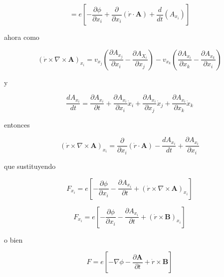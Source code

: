\documentclass[12pt,a4paper]{article}
\begin{document}
\begin{enumerate}
    \begin{equation*}
        = e\left[-\frac{\partial \phi}{\partial x_i}  +\frac{\partial}{\partial x_{i}}\left( \dot{r} \cdot \mathbf{A}\right) + \frac{d}{dt} \left( A_{x_i}\right)\right]
    \end{equation*}
        
        
    ahora como
    
    \begin{equation*}
        (\dot{r} \times \nabla \times \mathbf{A})_{x_i} = v_{x_j} \left(\frac{\partial A_{x_j}}{\partial x_i} - \frac{\partial A_{X_i}}{\partial x_j}\right) - v_{x_k} \left( \frac{\partial A_{x_i}}{\partial x_k} - \frac{\partial A_{x_k}}{\partial x_i}\right)
    \end{equation*}
    
    y
    
    \begin{equation*}
        \frac{d A_{x_i}}{d t} = \frac{\partial A_{x_i}}{\partial t} + \frac{\partial A_{x_i}}{\partial x_i} \dot{x}_i + \frac{\partial A_{x_i}}{\partial x_j} \dot{x}_j  + \frac{\partial A_{x_i}}{\partial x_k} \dot{x}_k
    \end{equation*}
    
    entonces
    
    \begin{equation*}
        (\dot{r} \times \nabla \times \mathbf{A})_{x_i} = \frac{\partial}{\partial x_i} (\dot{r} \cdot \mathbf{A}) - \frac{d A_{x_i}}{d t} + \frac{\partial A_{x_i}}{\partial x_i}
    \end{equation*}
    
    que sustituyendo
    
    \begin{equation*}
        F_{x_i} = e \left[-\frac{\partial \phi}{\partial x_i} - \frac{\partial A_{x_i}}{\partial t} + (\dot{r} \times \nabla \times \mathbf{A})_{x_i} \right]
    \end{equation*}
    
    \begin{equation*}
        F_{x_i} = e \left[-\frac{\partial \phi}{\partial x_i} - \frac{\partial A_{x_i}}{\partial t} + (\dot{r} \times \mathbf{B})_{x_i} \right]
    \end{equation*}
    
    o bien
    
    \begin{equation*}
         F = e \left[-\nabla \phi - \frac{\partial \mathbf{A}}{\partial t} + \dot{r} \times \mathbf{B} \right]
    \end{equation*}
    

\end{enumerate}
\end{document}
